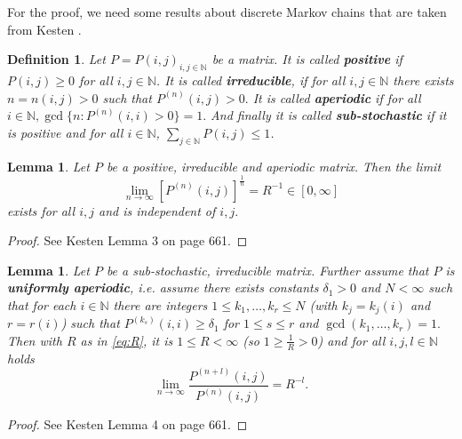 \documentclass[12pt,a4paper]{scrartcl}
\newtheorem{definition}[theorem]{Definition}
\newtheorem{lemma}[theorem]{Lemma}
\numberwithin{equation}{section}
\newcommand{\N}{\mathbb{N}} %
\begin{document}
For the proof, we need some results about discrete Markov chains that are taken from Kesten \cite{kesten}.

\begin{definition}
Let $P = P\left(i,j\right)_{i,j \in \N}$ be a matrix. It is called \textbf{positive} if $P\left(i,j\right) \geq 0$ for all $i,j \in \N$. It is called \textbf{irreducible}, if for all $i,j \in \N$ there exists $n = n\left(i,j\right) > 0$ such that $P^{\left(n\right)}\left(i,j\right) > 0.$ It is called \textbf{aperiodic} if for all $i \in \N, \gcd\lbrace n: P^{\left(n\right)}\left(i,i\right) > 0 \rbrace = 1.$ And finally it is called \textbf{sub-stochastic} if it is positive and for all $i \in \N$, $\sum_{j \in \N} P\left(i,j\right) \leq 1$.
\end{definition}

\begin{lemma} \label{kestenlemmaone} Let $P$ be a positive, irreducible and aperiodic matrix. Then the limit
\begin{equation} \label{eq:R}
\lim_{n \to \infty} \left[P^{\left(n\right)}\left(i,j\right) \right]^{\frac{1}{n}} = R^{-1} \in \left[0, \infty\right]
\end{equation}
exists for all $i,j$ and is independent of $i,j.$
\end{lemma}
\begin{proof}
See Kesten \cite{kesten} Lemma 3 on page 661.
\end{proof}

\begin{lemma} \label{kestenlemmatwo}
Let $P$ be a sub-stochastic, irreducible matrix. Further assume that $P$ is \textbf{uniformly aperiodic}, i.e. assume there exists constants $\delta_1 > 0$ and $N < \infty$ such that for each $i \in \N$ there are integers $1\leq k_1,\ldots,k_r \leq N$ (with $k_j = k_j\left(i\right)$ and $r=r\left(i\right)$) such that $P^{\left(k_s\right)}\left(i,i\right) \geq \delta_1$ for $1\leq s \leq r$ and $\gcd\left(k_1,\ldots,k_r\right) = 1.$
Then with $R$ as in \eqref{eq:R}, it is $1 \leq R < \infty$ (so $1\geq \frac{1}{R} > 0$) and for all $i,j,l \in \N$ holds
\begin{equation}
\lim_{n \to \infty} \frac{P^{\left(n+l\right)}\left(i,j\right)}{P^{\left(n\right)}\left(i,j\right)} = R^{-l}.
\end{equation}

\end{lemma}
\begin{proof}
See Kesten \cite{kesten} Lemma 4 on page 661.
\end{proof}
\end{document}
